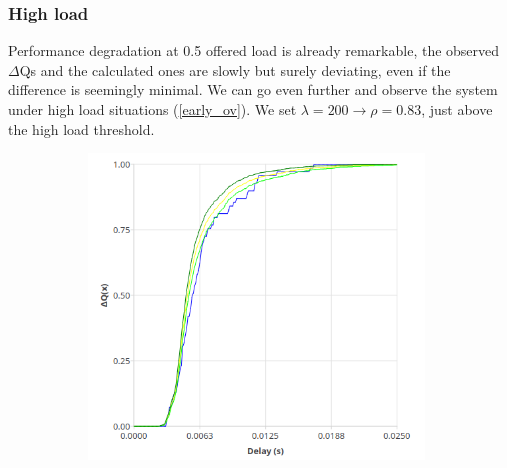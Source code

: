 \subsubsection{High load}
    Performance degradation at 0.5 offered load is already remarkable, the observed $\Delta$Qs and the calculated ones are slowly but surely deviating, even if the difference is seemingly minimal. We can go even further and observe the system under high load situations (\cref{early_ov}). We set $\lambda = 200 \rightarrow \rho = 0.83$, just above the high load threshold.
    
       \begin{figure}[H]
            \centering
            \begin{subfigure}{.5\textwidth}
                \centering
                \includegraphics[width=0.98\textwidth]{img/overload_2/250_worker.png}
                \label{fig:high_load_1}
            \end{subfigure}%
            \begin{subfigure}{.5\textwidth}
                \centering

\end{subfigure}
\end{figure}
